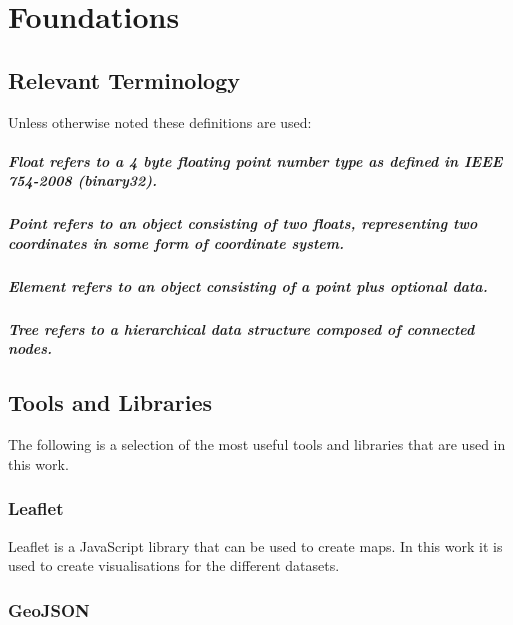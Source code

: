 
\chapter{Foundations}
\label{chap:fund}

\section{Relevant Terminology}

Unless otherwise noted these definitions are used:

\paragraph[Float]{\textit{Float} refers to a 4 byte floating point number type as defined in IEEE 754-2008 (\textit{binary32}).}
\paragraph[Point]{\textit{Point} refers to an object consisting of two floats, representing two coordinates in some form of coordinate system.}
\paragraph[Element]{\textit{Element} refers to an object consisting of a point plus optional data.}
\paragraph[Tree]{\textit{Tree} refers to a hierarchical data structure composed of connected nodes.}

\section{Tools and Libraries}

The following is a selection of the most useful tools and libraries that are used in this work.

\subsection{Leaflet}
\label{subs:leaflet}

Leaflet\cite{leaflet} is a JavaScript library that can be used to create maps. In this work it is used to create visualisations for the different datasets.

\subsection{GeoJSON}
\label{subs:geojson}

